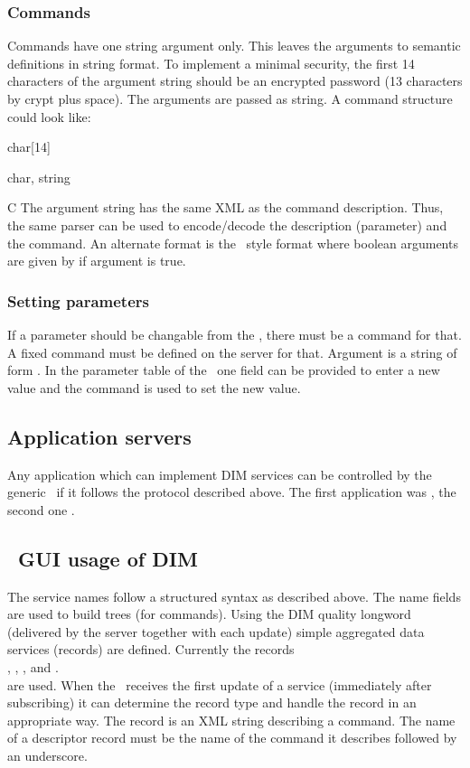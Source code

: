 \subsubsection{Commands}
Commands have one string argument only. This leaves the arguments to semantic definitions in string format. To implement a minimal security, the first 14 characters of the argument string should be an encrypted password (13 characters by crypt plus space). The arguments are passed as string. A command structure could look like:
\bdes
\item[password]   char[14]
\item[argument]   char,  string
\item[Format:] C
\edes
The argument string has the same XML as the command description. Thus, the same parser can be used to encode/decode the description (parameter) and the command. An alternate format is the \mbs\ style format  where boolean arguments are given by  if argument is true.
\subsubsection{Setting parameters}
If a parameter should be changable from the \gui, there must be a command for that. A fixed command  must be defined on the server for that. 
Argument is a string of form . In the parameter table of the \gui\ one field can be provided to enter a new value and the command  is used to set the new value.
\subsection{Application servers}
Any application which can implement DIM services can be controlled by the generic \gui\ if it follows the protocol described above. The first application was \dabc, the second one \mbs.
\subsection{\dabc\ GUI usage of DIM}
The service names follow a structured syntax as described above. The name fields are used to
build trees (for commands). Using the DIM quality longword (delivered by the server together
with each update) simple aggregated data services (records) are defined.
Currently the records \\
, , ,  and .\\
are used. When the \gui\ receives the first update of a service (immediately after subscribing)
it can determine the record type and handle the record in an appropriate way.
The  record is an XML string describing a command.
The name of a descriptor record must be the name of the command it describes followed by an underscore.

